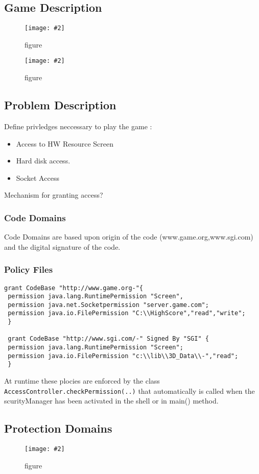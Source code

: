 \documentclass[a4paper,10pt]{scrreprt}
\newcommand{\pic}[2][figure]{\begin{figure}[h]
 \centering
 \texttt{[image: \#2]}
 \caption{#1}
\end{figure}
}
\begin{document}
\subsection{Game Description}
\pic{gd1.png}
\pic{gd2.png}
\pagebreak
\subsection{Problem Description}
Define privledges neccessary to play the game : 
\begin{itemize}
 \item Access to HW Resource Screen
 \item Hard disk access.
 \item Socket Access
\end{itemize}

Mechanism for granting access? 
\subsubsection{Code Domains}
Code Domains are based upon origin of the code (www.game.org,www.sgi.com) and the digital signature of the code. 

\subsubsection{Policy Files}
\begin{lstlisting}[caption=Java Policy Files for the Game]
 grant CodeBase "http://www.game.org-"{
 permission java.lang.RuntimePermission "Screen",
 permission java.net.Socketpermission "server.game.com";
 permission java.io.FilePermission "C:\\HighScore","read","write";
 }
 
 grant CodeBase "http://www.sgi.com/-" Signed By "SGI" {
 permission java.lang.RuntimePermission "Screen";
 permission java.io.FilePermission "c:\\lib\\3D_Data\\-","read";
 }
\end{lstlisting}

At runtime these plocies are enforced by the class \texttt{AccessController.checkPermission(..)} that automatically is 
called when the scurityManager has been activated in the shell or in main() method.

\subsection{Protection Domains}
\pic{pd1.png}
\end{document}
